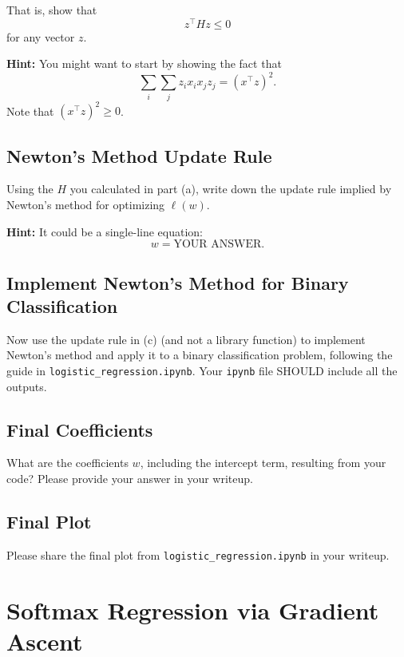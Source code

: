 \documentclass[lang=cn,11pt]{elegantbook}
\begin{document}
That is, show that
\begin{equation}
    z^\top H z \leq 0
\end{equation}
for any vector $z$. 

\textbf{Hint:} You might want to start by showing the fact that
\begin{equation}
    \sum_{i} \sum_{j} z_i x_i x_j z_j = (x^\top z)^2.
\end{equation}
Note that $(x^\top z)^2 \geq 0$.

\subsection{Newton's Method Update Rule}

Using the $H$ you calculated in part (a), write down the update rule implied by Newton’s method for optimizing $\ell(w)$. 

\textbf{Hint:} It could be a single-line equation:
\begin{equation}
    w = \text{YOUR ANSWER}.
\end{equation}

\subsection{Implement Newton’s Method for Binary Classification}

Now use the update rule in (c) (and not a library function) to implement Newton’s method and apply it to a binary classification problem, following the guide in \texttt{logistic\_regression.ipynb}. Your \texttt{ipynb} file SHOULD include all the outputs.

\subsection{Final Coefficients}

What are the coefficients $w$, including the intercept term, resulting from your code? Please provide your answer in your writeup.

\subsection{Final Plot}

Please share the final plot from \texttt{logistic\_regression.ipynb} in your writeup.



\section{Softmax Regression via Gradient Ascent}
\end{document}
